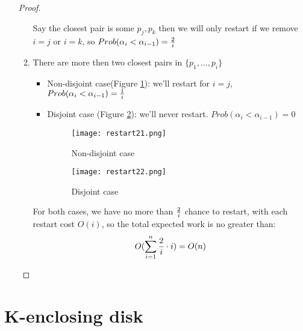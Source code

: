 \documentclass[12pt]{article}
\newcommand{\fref}[1]{Figure \ref{#1}}
\begin{document}
\begin{enumerate}
\begin{proof}
\begin{enumerate}[{Case }1.]
          Say the closest pair is some $p_j, p_k$ then we will only
          restart if we remove $i = j$ or $i = k$, so $Prob(\alpha_i <
          \alpha_{i - 1}) = {2 \over i}$
        \item There are more then two closest pairs in
          $\{p_1, \dots, p_i\}$
          
          \begin{itemize}
          \item Non-disjoint case(\fref{fig:restart21}): we'll restart
            for $i = j$,
            $Prob(\alpha_i < \alpha_{i - 1}) = {1 \over i}$
          \item Disjoint case (\fref{fig:restart22}): we'll never
            restart.  $Prob(\alpha_i < \alpha_{i - 1}) = 0$
            \begin{figure}[h!]
              \centering
              \texttt{[image: restart21.png]}
              \caption{Non-disjoint case}
              \label{fig:restart21}
            \end{figure}
            \begin{figure}[h!]
              \centering
              \texttt{[image: restart22.png]}
              \caption{Disjoint case}
              \label{fig:restart22}
            \end{figure}
          \end{itemize}
          For both cases, we have no more than ${2 \over i}$ chance to
          restart, with each restart cost $O(i)$, so the total
          expected work is no greater
          than:$$O(\sum_{i = 1}^n{2 \over i} \cdot i) = O(n)$$
        \end{enumerate}
      \end{proof}
\end{enumerate}
\section{K-enclosing disk}

 \pagebreak


\end{document}
